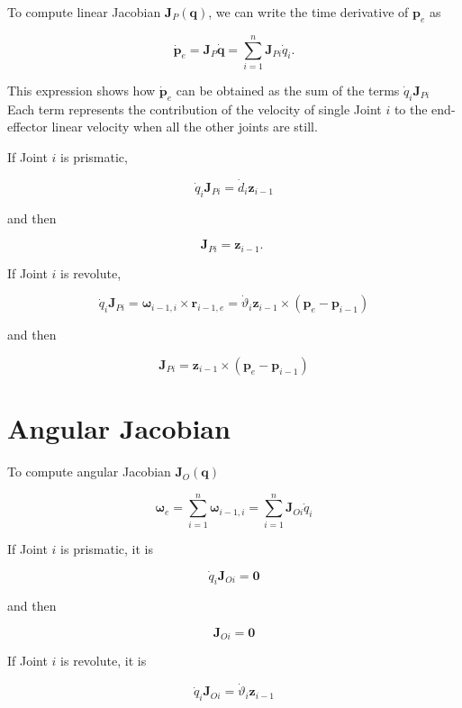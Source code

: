 \documentclass[10pt]{article}
\begin{document}
To compute linear Jacobian $\boldsymbol{J}_{P}(\boldsymbol{q})$, we can write the time derivative of $\boldsymbol{p}_{e}$ as

$$
\dot{\boldsymbol{p}}_{e}=\boldsymbol{J}_{P} \dot{\boldsymbol{q}}=\sum_{i=1}^{n} \boldsymbol{J}_{P i} \dot{q}_{i} .
$$


This expression shows how $\dot{\boldsymbol{p}}_{e}$ can be obtained as the sum of the terms $\dot{q}_{i} \boldsymbol{J}_{P i}$ Each term represents the contribution of the velocity of single Joint $i$ to the end-effector linear velocity when all the other joints are still.





If Joint $i$ is prismatic, 
  
  $$
\dot{q}_{i} \boldsymbol{J}_{P i}=\dot{d}_{i} \boldsymbol{z}_{i-1}
$$

and then

$$
\boldsymbol{J}_{P i}=\boldsymbol{z}_{i-1} \text {. }
$$

If Joint $i$ is revolute, 


$$
\dot{q}_{i} \boldsymbol{J}_{P i}=\boldsymbol{\omega}_{i-1, i} \times \boldsymbol{r}_{i-1, e}=\dot{\vartheta}_{i} \boldsymbol{z}_{i-1} \times\left(\boldsymbol{p}_{e}-\boldsymbol{p}_{i-1}\right)
$$

and then

$$
\boldsymbol{J}_{P i}=\boldsymbol{z}_{i-1} \times\left(\boldsymbol{p}_{e}-\boldsymbol{p}_{i-1}\right)
$$




\section{Angular Jacobian}


To compute angular Jacobian $\boldsymbol{J}_{O}(\boldsymbol{q})$



$$
\boldsymbol{\omega}_{e}=\sum_{i=1}^{n} \boldsymbol{\omega}_{i-1, i}=\sum_{i=1}^{n} \boldsymbol{J}_{O i} \dot{q}_{i}
$$

 If Joint $i$ is prismatic, it is

  $$
\dot{q}_{i} \boldsymbol{J}_{O i}=\mathbf{0}
$$

and then

$$
\boldsymbol{J}_{O i}=\mathbf{0}
$$

If Joint $i$ is revolute, it is

 $$
\dot{q}_{i} \boldsymbol{J}_{O i}=\dot{\vartheta}_{i} \boldsymbol{z}_{i-1}
$$
\end{document}
